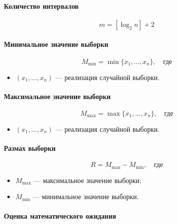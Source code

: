 \documentclass[a4paper, 12pt]{article}
\theoremstyle{definition}
\begin{document}
\paragraph{Количество интервалов}
\begin{equation}
m = [\log_2 n] + 2
\end{equation}


\paragraph{Минимальное значение выборки}

\begin{equation}
M_{\min} = \min \{ x_1, \dots, x_n\}, \quad \text{где}
\end{equation}
\begin{itemize}
	\item $(x_1, \dots, x_n)$ --- реализация случайной выборки.
\end{itemize}


\paragraph{Максимальное значение выборки}

\begin{equation}
M_{\max} = \max \{ x_1, \dots, x_n\}, \quad \text{где}
\end{equation}
\begin{itemize}
	\item $(x_1, \dots, x_n)$ --- реализация случайной выборки.
\end{itemize}


\paragraph{Размах выборки}

\begin{equation}
R = M_{\max} - M_{\min}, \quad \text{где}
\end{equation}
\begin{itemize}
	\item $M_{\max}$ --- максимальное значение выборки;
	\item $M_{\min}$ --- минимальное значение выборки.
\end{itemize}


\paragraph{Оценка математического ожидания}
\end{document}
